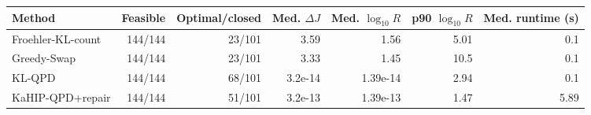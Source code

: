 \begin{tabular}{lrrrrrr}
\toprule
Method & Feasible & Optimal/closed & Med. $\Delta J$ & Med. $\log_{10}R$ & p90 $\log_{10}R$ & Med. runtime (s)\\
\midrule
Froehler-KL-count & 144/144 & 23/101 & 3.59 & 1.56 & 5.01 & 0.1\\
Greedy-Swap & 144/144 & 23/101 & 3.33 & 1.45 & 10.5 & 0.1\\
KL-QPD & 144/144 & 68/101 & 3.2e-14 & 1.39e-14 & 2.94 & 0.1\\
KaHIP-QPD+repair & 144/144 & 51/101 & 3.2e-13 & 1.39e-13 & 1.47 & 5.89\\
\bottomrule
\end{tabular}
